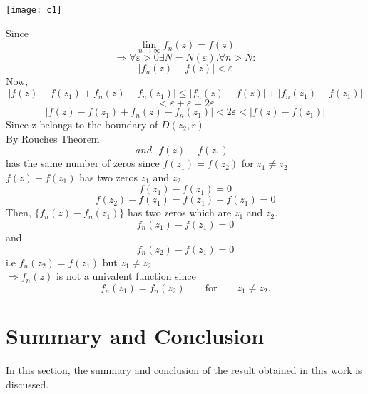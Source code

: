 \documentclass[a4paper, 12pt]{report}
\begin{document}
{\begin{center}
\texttt{[image: c1]}
\end{center}

Since
\begin{equation*}
\lim_{n \to \infty}f_n(z) = f(z)
\end{equation*}
\begin{equation*}
\Rightarrow \forall \varepsilon > 0 \exists N = N(\varepsilon). \forall n > N:
\end{equation*}
\begin{equation*}
|f_n(z) - f(z)| < \varepsilon 
\end{equation*}
Now,
\begin{equation*}
|f(z) - f(z_1) + f_n(z) - f_n(z_1)| \leq |f_n(z) - f(z)| + |f_n(z_1) - f(z_1)|
\end{equation*}
\begin{equation*}
< \varepsilon + \varepsilon = 2\varepsilon
\end{equation*}
\begin{equation*}
|f(z) - f(z_1) + f_n(z) - f_n(z_1)| < 2\varepsilon < |f(z) - f(z_1)|
\end{equation*}
Since z belongs to the boundary of $D(z_2, r)$\\
By Rouches Theorem
\begin{equation*}
[f_n(z) - f_n(z_1)] and [f(z) - f(z_1)]
\end{equation*}
has the same number of zeros since $f(z_1) = f(z_2)$ for $z_1 \neq z_2$\\
$f(z) - f(z_1)$ has two zeros $z_1$ and $z_2$
\begin{equation*}
f(z_1) - f(z_1) = 0
\end{equation*}
\begin{equation*}
f(z_2) - f(z_1) = f(z_1) - f(z_1) = 0
\end{equation*}
Then,
$\{f_n(z) - f_n(z_1)\}$ has two zeros which are $z_1$ and $z_2$.
\begin{equation*}
f_n(z_1) - f(z_1) = 0
\end{equation*}
and
\begin{equation*}
f_n(z_2) - f(z_1) = 0
\end{equation*}
i.e $f_n(z_2) = f(z_1)$ but $z_1 \neq z_2$.\\
$\Rightarrow f_n(z)$ is not a univalent function since
\begin{equation*}
f_n(z_1) = f_n(z_2) \qquad \text{for} \qquad z_1 \neq z_2.
\end{equation*}
\chapter{Summary and Conclusion}
In this section, the summary and conclusion of the result obtained in this work is discussed.
}
\end{document}
